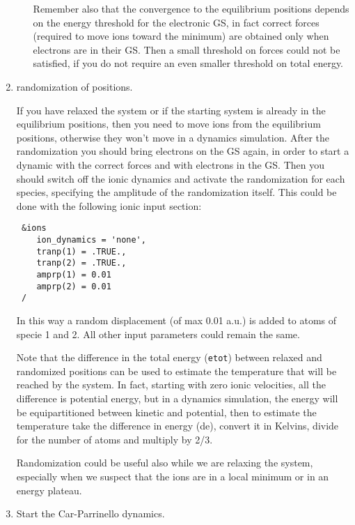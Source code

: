 \documentclass[12pt,a4paper]{article}
\begin{document}
\begin{enumerate}
\begin{enumerate}
        Remember also that the convergence to the equilibrium
        positions depends on the energy threshold for the electronic
        GS, in fact correct forces (required to move ions toward the
        minimum) are obtained only when electrons are in their GS.
        Then a small threshold on forces could not be satisfied, if
        you do not require an even smaller threshold on total energy.
    \end{enumerate}

  \item
    randomization of positions.

    If you have relaxed the system or if the starting system is
    already in the equilibrium positions, then you need to move ions
    from the equilibrium positions, otherwise they won't move in a
    dynamics simulation.
    After the randomization you should bring electrons on the GS
    again, in order to start a dynamic with the correct forces and
    with electrons in the GS.
    Then you should switch off the ionic dynamics and activate the
    randomization for each species, specifying the amplitude of the
    randomization itself.
    This could be done with the following ionic input section:
\begin{verbatim}
 &ions
    ion_dynamics = 'none',
    tranp(1) = .TRUE.,
    tranp(2) = .TRUE.,
    amprp(1) = 0.01
    amprp(2) = 0.01
 /
\end{verbatim}
    In this way a random displacement (of max 0.01 a.u.) is added to
    atoms of specie 1 and 2.
    All other input parameters could remain the same.

    Note that the difference in the total energy (\texttt{etot})
    between relaxed and randomized positions can be used to estimate
    the temperature that will be reached by the system.
    In fact, starting with zero ionic velocities, all the difference
    is potential energy, but in a dynamics simulation, the energy will
    be equipartitioned between kinetic and potential, then to estimate
    the temperature take the difference in energy (de), convert it in
    Kelvins, divide for the number of atoms and multiply by 2/3.

    Randomization could be useful also while we are relaxing the
    system, especially when we suspect that the ions are in a local
    minimum or in an energy plateau.
   
  \item
    Start the Car-Parrinello dynamics.


\end{enumerate}
\end{document}
